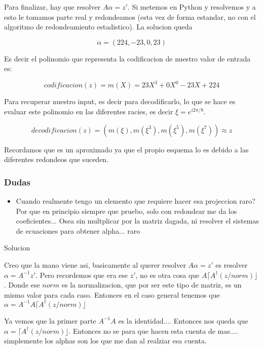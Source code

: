 \documentclass[12pt, oneside]{article}
\begin{document}
Para finalizar, hay que resolver $A\alpha = z'$.
Si metemos en Python y resolvemos y a esto le tomamos parte real y redondeamos
(esta vez de forma estandar, no con el algoritmo de redondeamiento estadistico).
La solucion queda

\begin{equation*}
    \alpha = (224, -23, 0, 23)
\end{equation*}

Es decir el polinomio que representa la codificacion de nuestro valor de entrada es:


\begin{equation*}
    codificacion(z) = m(X) = 23X^3+0X^0-23X+224
\end{equation*}

Para recuperar nuestro input, es decir para decodificarlo, lo que se hace es
evaluar este polinomio en las diferentes racies, es decir $\xi=e^{i2\pi/8 }$.

\begin{equation*}
    decodificacion(z) = ( m(\xi), m(\xi^3), m(\xi^5), m(\xi^7)) \approx z
\end{equation*}

Recordamos que es un aproximado ya que el propio esquema lo es debido a las diferentes
redondeos que suceden.

\subsubsection{Dudas}
\begin{itemize}
  \item Cuando realmente tengo un elemento que requiere hacer esa projeccion raro? Por que en principio siempre que pruebo, solo con redondear me da los coeficientes...
  Osea sin multplicar por la matriz dagada, ni resolver el sistemas de ecuaciones para obtener alpha... raro
\end{itemize}
Solucion

Creo que la mano viene asi, basicamente al querer resolver $A\alpha=z'$ es resolver $\alpha=A^{-1}z'$.
Pero recordemos que era ese $z'$, no es otra cosa que $A\lceil A^{\dagger}(z/norm)\rfloor$.
Donde ese $norm$ es la normalizacion, que por ser este tipo de matriz, es un mismo valor para cada caso.
Entonces en el caso general tenemos que $\alpha=A^{-1}A\lceil A^{\dagger}(z/norm)\rfloor$

Ya vemos que la primer parte $A^{-1}A$ es la identidad....
Entonces nos queda que $\alpha=\lceil A^{\dagger}(z/norm)\rfloor$.
Entonces no se para que hacen esta cuenta de mas.... simplemente los alphas son
los que me dan al realziar esa cuenta.
\end{document}
